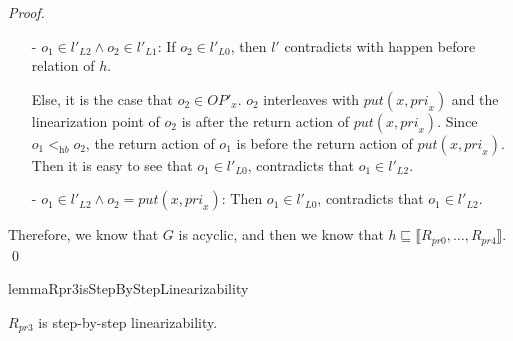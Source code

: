 \begin {proof}
\begin{itemize}
\item[-] $o_1 \in l'_{L2} \wedge o_2 \in l'_{L1}$: If $o_2 \in l'_{L0}$, then $l'$ contradicts with happen before relation of $h$.

    Else, it is the case that $o_2 \in \textit{OP}'_x$. $o_2$ interleaves with $\textit{put}(x,\textit{pri}_x)$ and the linearization point of $o_2$ is after the return action of $\textit{put}(x,\textit{pri}_x)$. Since $o_1 <_{\textit{hb}} o_2$, the return action of $o_1$ is before the return action of $\textit{put}(x,\textit{pri}_x)$. Then it is easy to see that $o_1 \in l'_{L0}$, contradicts that $o_1 \in l'_{L2}$.

\item[-] $o_1 \in l'_{L2} \wedge o_2 = \textit{put}(x,\textit{pri}_x)$: Then $o_1 \in l'_{L0}$, contradicts that $o_1 \in l'_{L2}$.
\end{itemize}

Therefore, we know that $G$ is acyclic, and then we know that $h \sqsubseteq \llbracket R_{\textit{pr0}},\ldots,R_{\textit{pr4}} \rrbracket$. \qed
\end {proof}



\begin{restatable}{lemma}{Rpr3isStepByStepLinearizability}
\label{lemma:Rpr3 is step-by-step linearizability}

$R_{\textit{pr3}}$ is step-by-step linearizability.

\end{restatable}

